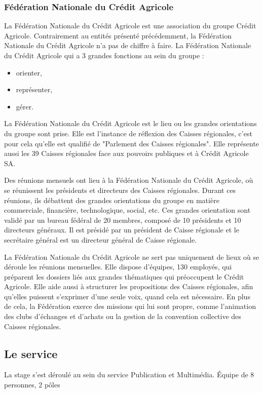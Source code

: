 \documentclass[12pt,a4paper]{article}
\begin{document}
\subsubsection{Fédération Nationale du Crédit Agricole}
La Fédération Nationale du Crédit Agricole est une association du groupe Crédit Agricole. Contrairement au entités présenté précédemment, la Fédération Nationale du Crédit Agricole n'a pas de chiffre à faire. La Fédération Nationale du Crédit Agricole qui a 3 grandes fonctions au sein du groupe : 
\begin{itemize}
\item orienter,
\item représenter,
\item gérer.
\end{itemize}
La Fédération Nationale du Crédit Agricole est le lieu ou les grandes orientations du groupe sont prise. Elle est l'instance de réflexion des Caisses régionales, c'est pour cela qu'elle est qualifié de "Parlement des Caisses régionales". Elle représente aussi les 39 Caisses régionales face aux pouvoirs publiques et à Crédit Agricole SA.\par 
\bigskip
Des réunions mensuels ont lieu à la Fédération Nationale du Crédit Agricole, où se réunissent les présidents et directeurs des Caisses régionales. Durant ces réunions, ils débattent des grandes orientations du groupe en matière commerciale, financière, technologique, social, etc. Ces grandes orientation sont validé par un bureau fédéral de 20 membres, composé de 10 présidents et 10 directeurs généraux. Il est présidé par un président de Caisse régionale et le secrétaire général est un directeur général de Caisse régionale.\par 
\bigskip
La Fédération Nationale du Crédit Agricole ne sert pas uniquement de lieux où se déroule les réunions mensuelles. Elle dispose d'équipes, 130 employés, qui préparent les dossiers liés aux grandes thématiques qui préoccupent le Crédit Agricole. Elle aide aussi à structurer les propositions des Caisses régionales, afin qu'elles puissent s'exprimer d'une seule voix, quand cela est nécessaire. En plus de cela, la Fédération exerce des missions qui lui sont propre, comme l'animation des clubs d'échanges et d'achats ou la gestion de la convention collective des Caisses régionales.\par

\subsection{Le service}
La stage s'est déroulé au sein du service Publication et Multimédia. Équipe de 8 personnes, 2 pôles\par
\end{document}
